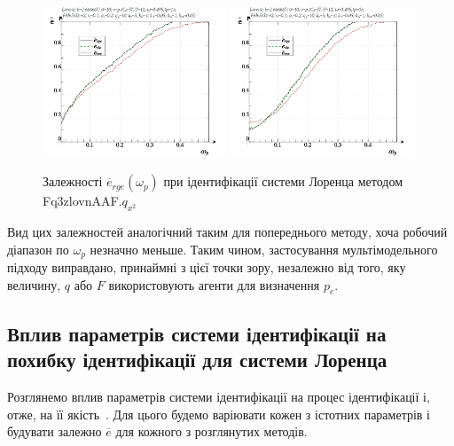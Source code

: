 \begin{figure}[ht!]
  \centerline{
    \includegraphics[width=0.49\textwidth]{p/cha/lor/Fq3zlovnAAF/lor_Fq3zlovnAAF_qx2-p_omega_p_e_sign.png}
    \hfill
    \includegraphics[width=0.49\textwidth]{p/cha/lor/Fq3zlovnAAF/lor_Fq3zlovnAAF_qx2-p_omega_p_e_sin.png}
  }
\caption{Залежності $ \overline{e}_{rge} (\omega_p) $ при ідентифікації системи Лоренца методом Fq3zlovnAAF.$q_{x^2} $}
\label{atu:f:lor_Fq3zlovnAAF_e_omega_p}
\end{figure}

Вид цих залежностей аналогічний таким для попереднього методу,
хоча робочий діапазон по
$ \omega_p $ незначно меньше. Таким чином, застосування мультімодельного
підходу виправдано, принаймні з цієї точки зору, незалежно
від того, яку величину,
$ q $ або
$ F $ використовують агенти для визначення
$ p_e $.




\subsection{Вплив параметрів системи ідентифікації на похибку ідентифікації для системи Лоренца} %

Розглянемо вплив параметрів системи ідентифікації на процес
ідентифікації і, отже, на її якість~\cite{atu_ISDMCI2014}. Для цього будемо
варіювати кожен з істотних параметрів і будувати залежно
$ \overline{e} $ для кожного з розглянутих методів.


